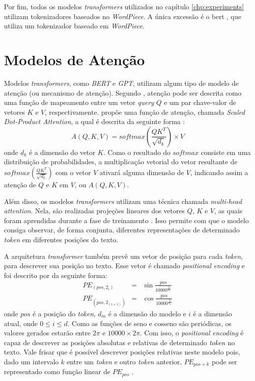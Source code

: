 Por fim, todos os modelos \textit{transformers} utilizados no capítulo \ref{chp:experiments} utilizam tokenizadores baseados no \textit{WordPiece}. A única excessão é o \gls{bert} \textcite{Devlin2019BERTPO}, que utiliza um tokenizador baseado em \textit{WordPiece}.

\section{Modelos de Atenção}
Modelos \textit{transformers}, como \textit{BERT} e \textit{GPT}, utilizam algum tipo de modelo de atenção (ou mecanismo de atenção). Segundo \textcite{Vaswani2017AttentionIA}, atenção pode ser descrita como uma função de mapeamento entre um vetor \textit{query} $Q$ e um par chave-valor de vetores $K$ e $V$, respectivamente. \textcite{Vaswani2017AttentionIA} propõe uma função de atenção, chamada \textit{Scaled Dot-Product Attention}, a qual é descrita da seguinte forma \cite{Vaswani2017AttentionIA}:
\begin{equation*}
A(Q, K, V)= softmax(\frac{QK^T}{\sqrt{d_k}}) \times V
\end{equation*}
onde $d_k$ é a dimensão do vetor $K$. Como o resultado do $softmax$ consiste em uma distribuição de probabilidades, a multiplicação vetorial do vetor resultante de $softmax(\frac{QK^T}{\sqrt{d_k}})$ com o vetor $V$ ativará alguma dimensão de $V$, indicando assim a atenção de $Q$ e $K$ em $V$, ou $A(Q, K, V)$.

Além disso, os modelos \textit{transformers} utilizam uma técnica chamada \textit{multi-head attention}. Nela, são realizadas projeções lineares dos vetores $Q$, $K$ e $V$, as quais foram aprendidas durante a fase de treinamento \cite{Vaswani2017AttentionIA}. Isso permite com que o modelo consiga observar, de forma conjunta, diferentes representações de determinado \textit{token} em diferentes posições do texto.

A arquitetura \textit{transformer} também prevê um vetor de posição para cada \textit{token}, para descrever sua posição no texto. Esse vetor é chamado \textit{positional encoding} e foi descrito por \textcite{Vaswani2017AttentionIA} da seguinte forma:
\begin{eqnarray*}
PE_{(pos, 2_i)} & = &\sin{\frac{pos}{10000^\frac{2_i}{d_m}}} \\
PE_{(pos, 2_(i+1))} & = & \cos{\frac{pos}{10000^\frac{2_i}{d_m}}}
\end{eqnarray*}
onde $pos$ é a posição do \textit{token}, $d_m$ é a dimensão do modelo e $i$ é a dimensão atual, onde $0 \leq i \leq d$. Como as funções de seno e cosseno são periódicas, os valores gerados estarão entre $2\pi$ e $10000 \times 2\pi$. Com isso, o \textit{positional encoding} é capaz de descrever as posições absolutas e relativas de determinado \textit{token} no texto. Vale frisar que é possível descrever posições relativas neste modelo pois, dado um intervalo $k$ entre um \textit{token} e outro \textit{token} anterior, $PE_{pos+k}$ pode ser representado como função linear de $PE_{pos}$ \cite{Vaswani2017AttentionIA}.

